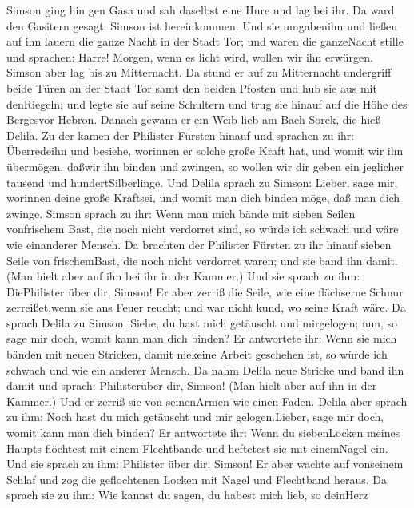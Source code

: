  Simson ging hin gen Gasa und sah daselbst eine Hure und lag
bei ihr.  Da ward den Gasitern gesagt: Simson ist
hereinkommen. Und sie umgabenihn und ließen auf ihn lauern die ganze
Nacht in der Stadt Tor; und waren die ganzeNacht stille und sprachen:
Harre! Morgen, wenn es licht wird, wollen wir ihn erwürgen. 
Simson aber lag bis zu Mitternacht. Da stund er auf zu Mitternacht
undergriff beide Türen an der Stadt Tor samt den beiden Pfosten und hub
sie aus mit denRiegeln; und legte sie auf seine Schultern und trug sie
hinauf auf die Höhe des Bergesvor Hebron.  Danach gewann er
ein Weib lieb am Bach Sorek, die hieß Delila.  Zu der kamen
der Philister Fürsten hinauf und sprachen zu ihr: Überredeihn und
besiehe, worinnen er solche große Kraft hat, und womit wir ihn
übermögen, daßwir ihn binden und zwingen, so wollen wir dir geben ein
jeglicher tausend und hundertSilberlinge.  Und Delila sprach
zu Simson: Lieber, sage mir, worinnen deine große Kraftsei, und womit
man dich binden möge, daß man dich zwinge.  Simson sprach zu
ihr: Wenn man mich bände mit sieben Seilen vonfrischem Bast, die noch
nicht verdorret sind, so würde ich schwach und wäre wie einanderer
Mensch.  Da brachten der Philister Fürsten zu ihr hinauf
sieben Seile von frischemBast, die noch nicht verdorret waren; und sie
band ihn damit.  (Man hielt aber auf ihn bei ihr in der
Kammer.) Und sie sprach zu ihm: DiePhilister über dir, Simson! Er aber
zerriß die Seile, wie eine flächserne Schnur zerreißet,wenn sie ans
Feuer reucht; und war nicht kund, wo seine Kraft wäre.  Da
sprach Delila zu Simson: Siehe, du hast mich getäuscht und mirgelogen;
nun, so sage mir doch, womit kann man dich binden?  Er
antwortete ihr: Wenn sie mich bänden mit neuen Stricken, damit niekeine
Arbeit geschehen ist, so würde ich schwach und wie ein anderer Mensch.
 Da nahm Delila neue Stricke und band ihn damit und sprach:
Philisterüber dir, Simson! (Man hielt aber auf ihn in der Kammer.) Und
er zerriß sie von seinenArmen wie einen Faden.  Delila aber
sprach zu ihm: Noch hast du mich getäuscht und mir gelogen.Lieber, sage
mir doch, womit kann man dich binden? Er antwortete ihr: Wenn du
siebenLocken meines Haupts flöchtest mit einem Flechtbande und heftetest
sie mit einemNagel ein.  Und sie sprach zu ihm: Philister
über dir, Simson! Er aber wachte auf vonseinem Schlaf und zog die
geflochtenen Locken mit Nagel und Flechtband heraus.  Da
sprach sie zu ihm: Wie kannst du sagen, du habest mich lieb, so deinHerz
